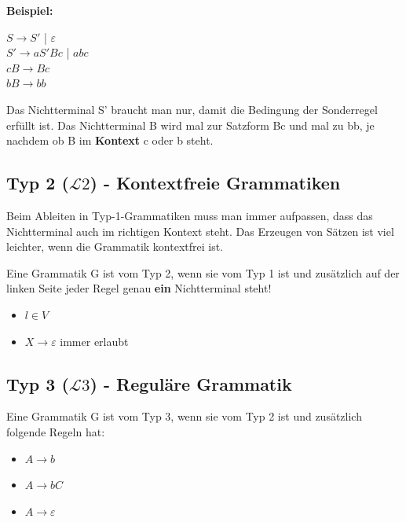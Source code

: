 \documentclass[11pt, a4paper]{scrartcl}
\begin{document}
\raggedright
\textbf{Beispiel:}

$S \rightarrow S'$ | $\varepsilon$ \\
$S' \rightarrow aS'Bc$ | $abc$ \\
$cB \rightarrow Bc$ \\
$bB \rightarrow bb$ 

\vspace{0.5em}

Das Nichtterminal S' braucht man nur, damit die Bedingung der Sonderregel erfüllt ist. 
Das Nichtterminal B wird mal zur Satzform Bc und mal zu bb, je nachdem ob B im \textbf{Kontext} c oder b steht. 

\vspace{0.5em}

\subsection{Typ 2 ($\mathcal{L}2$) - Kontextfreie Grammatiken}

Beim Ableiten in Typ-1-Grammatiken muss man immer aufpassen, dass das Nichtterminal auch im richtigen Kontext steht. 
Das Erzeugen von Sätzen ist viel leichter, wenn die Grammatik kontextfrei ist. 

Eine Grammatik G ist vom Typ 2, wenn sie vom Typ 1 ist und zusätzlich auf der linken Seite jeder Regel genau \textbf{ein} Nichtterminal steht!

\begin{itemize}
    \item $l \in V$
    \item $X \rightarrow \varepsilon$ immer erlaubt
\end{itemize}

\vspace{0.5em}

\subsection{Typ 3 ($\mathcal{L}3$) - Reguläre Grammatik}

Eine Grammatik G ist vom Typ 3, wenn sie vom Typ 2 ist und zusätzlich folgende Regeln hat:

\begin{itemize}
    \item $A \rightarrow b$
    \item $A \rightarrow bC$
    \item $A \rightarrow \varepsilon$
\end{itemize}
\end{document}
